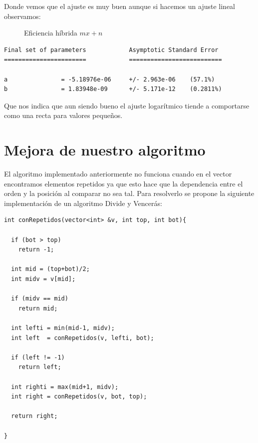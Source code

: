 \documentclass{article}
\begin{document}
Donde vemos que el ajuste es muy buen aunque si hacemos un ajuste lineal observamos: 

\begin{figure}[H]
  \centering   

\caption{Eficiencia híbrida $mx+n$}
\end{figure}

\begin{verbatim}
Final set of parameters            Asymptotic Standard Error
=======================            ==========================

a               = -5.18976e-06     +/- 2.963e-06    (57.1%)
b               = 1.83948e-09      +/- 5.171e-12    (0.2811%)

\end{verbatim}

Que nos indica que aun siendo bueno el ajuste logarítmico tiende a
comportarse como una recta para valores pequeños.

\section{Mejora de nuestro algoritmo}

El algoritmo implementado anteriormente no funciona cuando en el
vector encontramos elementos repetidos ya que esto hace que la
dependencia entre el orden y la posición al comparar no sea tal. Para
resolverlo se propone la siguiente implementación de un algoritmo
Divide y Vencerás:

\begin{lstlisting}
int conRepetidos(vector<int> &v, int top, int bot){

  if (bot > top)
    return -1;

  int mid = (top+bot)/2;
  int midv = v[mid];

  if (midv == mid)
    return mid;

  int lefti = min(mid-1, midv);
  int left  = conRepetidos(v, lefti, bot);

  if (left != -1)
    return left;

  int righti = max(mid+1, midv);
  int right = conRepetidos(v, bot, top);

  return right;
      
}
\end{lstlisting}
\end{document}
